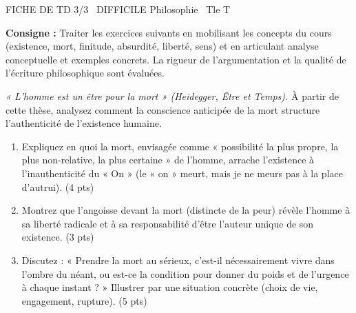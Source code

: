 \documentclass[11pt]{article}
\begin{document}
\begin{tcolorbox}[enhanced,colback=popink,colframe=popink,arc=10pt,boxrule=0pt,left=12pt,right=12pt,top=9pt,bottom=9pt]
{\color{white}\popxbold\small FICHE DE TD 3/3 \textbullet\ DIFFICILE \hfill Philosophie \textbullet\ Tle T\par}
\end{tcolorbox}
\vspace{4pt}
\noindent\textbf{Consigne :} Traiter les exercices suivants en mobilisant les concepts du cours (existence, mort, finitude, absurdité, liberté, sens) et en articulant analyse conceptuelle et exemples concrets. La rigueur de l'argumentation et la qualité de l'écriture philosophique sont évaluées.

\begin{exercice}
\emph{« L'homme est un être pour la mort » (Heidegger, \textit{Être et Temps}).} À partir de cette thèse, analysez comment la conscience anticipée de la mort structure l'authenticité de l'existence humaine.

\begin{enumerate}
    \item Expliquez en quoi la mort, envisagée comme « possibilité la plus propre, la plus non-relative, la plus certaine » de l'homme, arrache l'existence à l'inauthenticité du « On » (le « on » meurt, mais je ne meurs pas à la place d'autrui). (4 pts)
    \item Montrez que l'angoisse devant la mort (distincte de la peur) révèle l'homme à sa liberté radicale et à sa responsabilité d'être l'auteur unique de son existence. (3 pts)
    \item Discutez : « Prendre la mort au sérieux, c'est-il nécessairement vivre dans l'ombre du néant, ou est-ce la condition pour donner du poids et de l'urgence à chaque instant ? » Illustrer par une situation concrète (choix de vie, engagement, rupture). (5 pts)
\end{enumerate}
\end{exercice}
\end{document}
